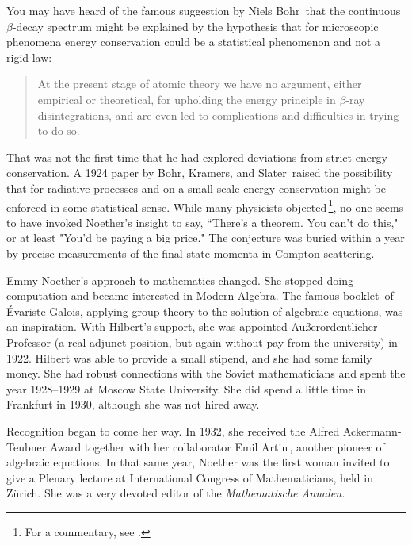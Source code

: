 \documentclass[twoside,symmetric]{tufte-handout}
\begin{document}
You may have heard of the famous suggestion by Niels Bohr$\,$\cite[]{JR9320000349} that the continuous $\beta$-decay spectrum might be explained by the hypothesis that for microscopic phenomena energy conservation could be a statistical phenomenon and not a rigid law:\newpage
\begin{quote}
At the present stage of atomic theory we have no argument, either empirical or theoretical, for upholding the energy principle in $\beta$-ray disintegrations, and are even led to complications and difficulties in trying to do so.
\end{quote}
 That was not the first time that he had explored deviations from strict energy conservation. A 1924 paper by Bohr, Kramers, and Slater$\,$\cite{BKS1924} raised the possibility that for radiative processes and on a small scale energy conservation might be enforced in some statistical sense. While many physicists objected$\,$\footnote{For a commentary, see .}, no one seems to have invoked Noether's insight to say, ``There's a theorem. You can't do this," or at least "You'd be paying a big price." The conjecture was buried within a year by precise measurements of the final-state momenta in Compton scattering.

 Emmy Noether's approach to mathematics changed. She stopped doing computation and became interested in Modern Algebra. The famous booklet$\,$\cite{Galois1846} of \'Evariste Galois, applying group theory to the solution of algebraic equations, was an inspiration. With Hilbert's support, she was appointed Au\ss erordentlicher Professor (a real adjunct position, but again without pay from the university) in 1922. Hilbert was able to provide a small stipend, and she had some family money. She had robust connections with the Soviet mathematicians and spent the year 1928--1929 at Moscow State University. She did spend a little time in Frankfurt in 1930, although she was not hired away.

Recognition began to come her way. In 1932, she received the Alfred Ackermann-Teubner Award together with her collaborator Emil Artin$\,$\cite{artin1998galois}, another pioneer of algebraic equations. In that same year, Noether was the first woman invited to give a Plenary lecture at International Congress of Mathematicians, held in Zürich. She was a very devoted editor of the \emph{Mathematische Annalen.}
\end{document}
